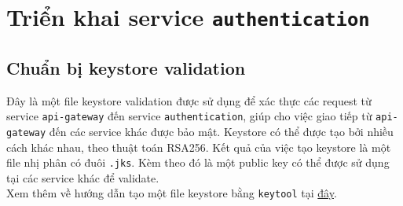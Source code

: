 \section{Triển khai service \texttt{authentication}}
\subsection{Chuẩn bị keystore validation}
Đây là một file keystore validation được sử dụng để xác thực các request từ service \texttt{api-gateway} đến service \texttt{authentication}, giúp cho việc giao tiếp từ \texttt{api-gateway} đến các service khác được bảo mật.
Keystore có thể được tạo bởi nhiều cách khác nhau, theo thuật toán RSA256. Kết quả của việc tạo keystore là một file nhị phân có đuôi \texttt{.jks}. Kèm theo đó là một public key có thể được sử dụng tại các service khác để validate.\\
Xem thêm về hướng dẫn tạo một file keystore bằng \texttt{keytool} tại \href{https://infocenter.sybase.com/help/index.jsp?topic=/com.sybase.infocenter.dc01611.0510/doc/html/emc1296683181727.html}{đây}.
